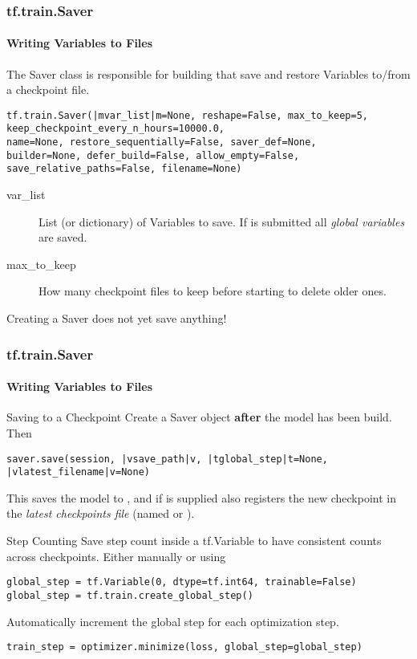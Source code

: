 
\begin{frame}[fragile]
    \frametitle{tf.train.Saver}
    \framesubtitle{Writing Variables to Files}
    The Saver class is responsible for building  that save and restore Variables to/from a checkpoint file.
    \begin{lstlisting}
tf.train.Saver(|mvar_list|m=None, reshape=False, max_to_keep=5, 
keep_checkpoint_every_n_hours=10000.0, 
name=None, restore_sequentially=False, saver_def=None, 
builder=None, defer_build=False, allow_empty=False, 
save_relative_paths=False, filename=None)
    \end{lstlisting}
    \begin{description}
        \item[var\_list] List (or dictionary) of Variables to save. If  is submitted all \emph{global variables} are saved.
        \item[max\_to\_keep] How many checkpoint files to keep before starting to delete older ones.
    \end{description}
    Creating a Saver does not yet save anything!
\end{frame}

\begin{frame}[fragile]
    \frametitle{tf.train.Saver}
    \framesubtitle{Writing Variables to Files}
    \begin{block}{Saving to a Checkpoint}
        Create a Saver object \textbf{after} the model has been build. Then
        \begin{lstlisting}
saver.save(session, |vsave_path|v, |tglobal_step|t=None, |vlatest_filename|v=None)
        \end{lstlisting}
        This saves the model to  , and if  is supplied also
        registers the new checkpoint in the \emph{latest checkpoints file} (named  or 
        ).
    \end{block}

    \begin{block}{Step Counting}
        Save step count inside a tf.Variable to have consistent counts across checkpoints. Either manually or using 
        \begin{lstlisting}
global_step = tf.Variable(0, dtype=tf.int64, trainable=False)
global_step = tf.train.create_global_step()
        \end{lstlisting}
        Automatically increment the global step for each optimization step.
        \begin{lstlisting}
train_step = optimizer.minimize(loss, global_step=global_step)
        \end{lstlisting}
    \end{block}
\end{frame}

